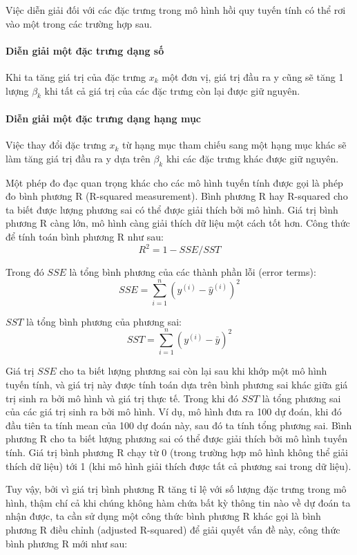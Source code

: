 \begin{packed_enum}
\end{packed_enum}
    
Việc diễn giải đối với các đặc trưng trong mô hình hồi quy tuyến tính có thể rơi vào một trong các trường hợp sau.

\paragraph{Diễn giải một đặc trưng dạng số} Khi ta tăng giá trị của đặc trưng $x_{k}$ một đơn vị, giá trị đầu ra y cũng sẽ tăng 1 lượng $\beta_k$ khi tất cả giá trị của các đặc trưng còn lại được giữ nguyên.

\paragraph{Diễn giải một đặc trưng dạng hạng mục} Việc thay đổi đặc trưng $x_{k}$ từ hạng mục tham chiếu  sang một hạng mục khác sẽ làm tăng giá trị đầu ra y dựa trên $\beta_k$ khi các đặc trưng khác được giữ nguyên.

Một phép đo đạc quan trọng khác cho các mô hình tuyến tính được gọi là phép đo bình phương R (R-squared measurement). Bình phương R hay R-squared cho ta biết được lượng phương sai có thể được giải thích bởi mô hình. Giá trị bình phương R càng lớn, mô hình càng giải thích dữ liệu một cách tốt hơn. Công thức để tính toán bình phương R như sau:
$$R^2=1-SSE/SST$$

Trong đó $SSE$ là tổng bình phương của các thành phần lỗi (error terms):
$$SSE=\sum_{i=1}^n(y^{(i)}-\hat{y}^{(i)})^2$$

$SST$ là tổng bình phương của phương sai:
$$SST=\sum_{i=1}^n(y^{(i)}-\bar{y})^2$$

Giá trị $SSE$ cho ta biết lượng phương sai còn lại sau khi khớp một mô hình tuyến tính, và giá trị này được tính toán dựa trên bình phương sai khác giữa giá trị sinh ra bởi mô hình và giá trị thực tế. Trong khi đó $SST$ là tổng phương sai của các giá trị sinh ra bởi mô hình. Ví dụ, mô hình đưa ra 100 dự đoán, khi đó đầu tiên ta tính mean của 100 dự đoán này, sau đó ta tính tổng phương sai. Bình phương R cho ta biết lượng phương sai có thể được giải thích bởi mô hình tuyến tính. Giá trị bình phương R chạy từ 0 (trong trường hợp mô hình không thể giải thích dữ liệu) tới 1 (khi mô hình giải thích được tất cả phương sai trong dữ liệu).

Tuy vậy, bởi vì giá trị bình phương R tăng tỉ lệ với số lượng đặc trưng trong mô hình, thậm chí cả khi chúng không hàm chứa bất kỳ thông tin nào về dự đoán ta nhận được, ta cần sử dụng một công thức bình phương R khác gọi là bình phương R điều chỉnh (adjusted R-squared) để giải quyết vấn đề này, công thức bình phương R mới như sau:


